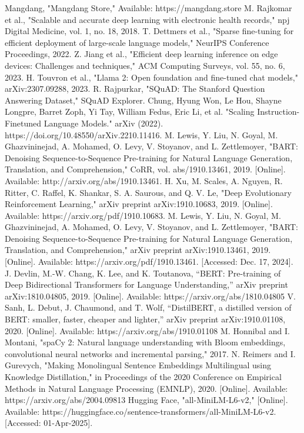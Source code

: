 \documentclass[conference]{IEEEtran}
\begin{document}
\begin{thebibliography}{00}
 Mangdang, "Mangdang Store," Available: https://mangdang.store
 M. Rajkomar et al., "Scalable and accurate deep learning with electronic health records," npj Digital Medicine, vol. 1, no. 18, 2018.
 T. Dettmers et al., "Sparse fine-tuning for efficient deployment of large-scale language models," NeurIPS Conference Proceedings, 2022.
 Z. Jiang et al., "Efficient deep learning inference on edge devices: Challenges and techniques," ACM Computing Surveys, vol. 55, no. 6, 2023.
 H. Touvron et al., "Llama 2: Open foundation and fine-tuned chat models," arXiv:2307.09288, 2023.
 R. Rajpurkar, "SQuAD: The Stanford Question Answering Dataset," SQuAD Explorer.
 Chung, Hyung Won, Le Hou, Shayne Longpre, Barret Zoph, Yi Tay, William Fedus, Eric Li, et al. "Scaling Instruction-Finetuned Language Models." arXiv (2022). https://doi.org/10.48550/arXiv.2210.11416.
 M. Lewis, Y. Liu, N. Goyal, M. Ghazvininejad, A. Mohamed, O. Levy, V. Stoyanov, and L. Zettlemoyer, "BART: Denoising Sequence-to-Sequence Pre-training for Natural Language Generation, Translation, and Comprehension," CoRR, vol. abs/1910.13461, 2019. [Online]. Available: http://arxiv.org/abs/1910.13461.
 H. Xu, M. Scales, A. Nguyen, R. Ritter, C. Raffel, K. Shankar, S. A. Saurous, and Q. V. Le, "Deep Evolutionary Reinforcement Learning," arXiv preprint arXiv:1910.10683, 2019. [Online]. Available: https://arxiv.org/pdf/1910.10683.
 M. Lewis, Y. Liu, N. Goyal, M. Ghazvininejad, A. Mohamed, O. Levy, V. Stoyanov, and L. Zettlemoyer, "BART: Denoising Sequence-to-Sequence Pre-training for Natural Language Generation, Translation, and Comprehension," arXiv preprint arXiv:1910.13461, 2019. [Online]. Available: https://arxiv.org/pdf/1910.13461. [Accessed: Dec. 17, 2024].
 J. Devlin, M.-W. Chang, K. Lee, and K. Toutanova, “BERT: Pre-training of Deep Bidirectional Transformers for Language Understanding,” arXiv preprint arXiv:1810.04805, 2019. [Online]. Available: https://arxiv.org/abs/1810.04805
 V. Sanh, L. Debut, J. Chaumond, and T. Wolf, “DistilBERT, a distilled version of BERT: smaller, faster, cheaper and lighter,” arXiv preprint arXiv:1910.01108, 2020. [Online]. Available: https://arxiv.org/abs/1910.01108
 M. Honnibal and I. Montani, "spaCy 2: Natural language understanding with Bloom embeddings, convolutional neural networks and incremental parsing," 2017.
 N. Reimers and I. Gurevych, "Making Monolingual Sentence Embeddings Multilingual using Knowledge Distillation," in Proceedings of the 2020 Conference on Empirical Methods in Natural Language Processing (EMNLP), 2020. [Online]. Available: https://arxiv.org/abs/2004.09813
 Hugging Face, "all-MiniLM-L6-v2," [Online]. Available: https://huggingface.co/sentence-transformers/all-MiniLM-L6-v2. [Accessed: 01-Apr-2025].
\end{thebibliography}
\end{document}
